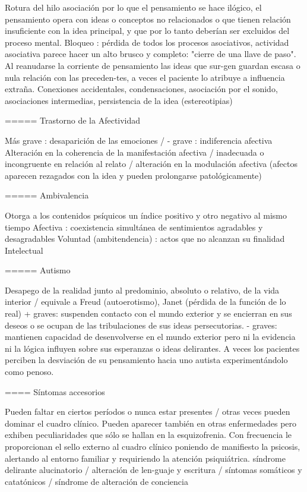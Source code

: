 \documentclass[encares.tex]{subfiles}
\begin{document}
Rotura del hilo asociación por lo que el pensamiento se hace ilógico, el pensamiento opera con ideas o conceptos no relacionados o que tienen relación insuficiente con la idea principal, y que por lo tanto deberían ser excluidos del proceso mental. Bloqueo : pérdida de todos los procesos asociativos, actividad asociativa parece hacer un alto brusco y completo: "cierre de una llave de paso". Al reanudarse la corriente de pensamiento las ideas que sur-gen guardan escasa o nula relación con las preceden-tes, a veces el paciente lo atribuye a influencia extraña. Conexiones accidentales, condensaciones, asociación por el sonido, asociaciones intermedias, persistencia de la idea (estereotipias)

===== Trastorno de la Afectividad

Más grave : desaparición de las emociones / - grave : indiferencia afectiva Alteración en la coherencia de la manifestación afectiva / inadecuada o incongruente en relación al relato / alteración en la modulación afectiva (afectos aparecen rezagados con la idea y pueden prolongarse patológicamente)

===== Ambivalencia

Otorga a los contenidos psíquicos un índice positivo y otro negativo al mismo tiempo Afectiva : coexistencia simultánea de sentimientos agradables y desagradables Voluntad (ambitendencia) : actos que no alcanzan su finalidad Intelectual

===== Autismo

Desapego de la realidad junto al predominio, absoluto o relativo, de la vida interior / equivale a Freud (autoerotismo), Janet (pérdida de la función de lo real) + graves: suspenden contacto con el mundo exterior y se encierran en sus deseos o se ocupan de las tribulaciones de sus ideas persecutorias. - graves: mantienen capacidad de desenvolverse en el mundo exterior pero ni la evidencia ni la lógica influyen sobre sus esperanzas o ideas delirantes. A veces los pacientes perciben la desviación de su pensamiento hacia uno autista experimentándolo como penoso.

==== Síntomas accesorios

Pueden faltar en ciertos períodos o nunca estar presentes / otras veces pueden dominar el cuadro clínico. Pueden aparecer también en otras enfermedades pero exhiben peculiaridades que sólo se hallan en la esquizofrenia. Con frecuencia le proporcionan el sello externo al cuadro clínico poniendo de manifiesto la psicosis, alertando al entorno familiar y requiriendo la atención psiquiátrica. síndrome delirante alucinatorio / alteración de len-guaje y escritura / síntomas somáticos y catatónicos / síndrome de alteración de conciencia
\end{document}
